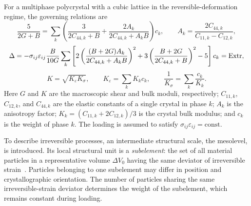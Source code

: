 For a multiphase polycrystal with a cubic lattice in the reversible-deformation regime, the governing relations are
\begin{equation}
 \frac{5}{2G+B}
 =\sum_k\left(
    \frac{3}{2C_{44,k}+B}
   +\frac{2A_k}{2C_{44,k}+A_kB}
  \right)c_k,
 \qquad
 A_k=\frac{2C_{44,k}}{C_{11,k}-C_{12,k}},
\end{equation}
\begin{equation}
 \Delta
 =-\sigma_{ij}\varepsilon_{ij}\frac{B}{10G}
 \sum_k\left[
  2\left(\frac{(B+2G)A_k}{2C_{44,k}+A_kB}\right)^2
 +3\left(\frac{B+2G}{2C_{44,k}+B}\right)^2-5
 \right]c_k
 =\operatorname{Extr},
\end{equation}
\begin{equation}
 K=\sqrt{K_\varepsilon K_\sigma},
 \qquad
 K_\varepsilon=\sum_k K_kc_k,
 \qquad
 \frac{1}{K_\sigma}=\sum_k\frac{c_k}{K_k}.
\end{equation}
Here $G$ and $K$ are the macroscopic shear and bulk moduli, respectively; $C_{11,k}$, $C_{12,k}$, and $C_{44,k}$ are the elastic constants of a single crystal in phase $k$; $A_k$ is the anisotropy factor; $K_k=(C_{11,k}+2C_{12,k})/3$ is the crystal bulk modulus; and $c_k$ is the weight of phase $k$. The loading is assumed to satisfy $\sigma_{ij}\varepsilon_{ij}=\text{const}$.

To describe irreversible processes, an intermediate structural scale, the mesolevel, is introduced. Its local structural unit is a \emph{subelement}: the set of all material particles in a representative volume $\Delta V_0$ having the same deviator of irreversible strain~\cite{shevchenko1976,shevchenko1992,marina2024}. Particles belonging to one subelement may differ in position and crystallographic orientation. The number of particles sharing the same irreversible-strain deviator determines the weight of the subelement, which remains constant during loading.

